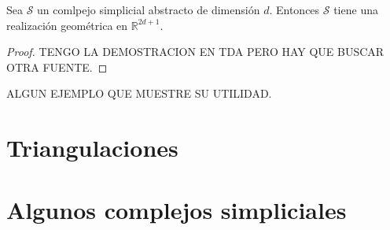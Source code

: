 \begin{lema}
	Sea $\mathcal{S}$ un comlpejo simplicial abstracto de dimensión $d$. Entonces $\mathcal{S}$ tiene 
	una realización geométrica en $\mathbb{R}^{2d+1}$.
\end{lema}
\begin{proof}
	TENGO LA DEMOSTRACION EN TDA PERO HAY QUE BUSCAR OTRA FUENTE.
\end{proof}

\begin{ejemplo}
	ALGUN EJEMPLO QUE MUESTRE SU UTILIDAD.
\end{ejemplo}

\section{Triangulaciones}



\section{Algunos complejos simpliciales}

\endinput
